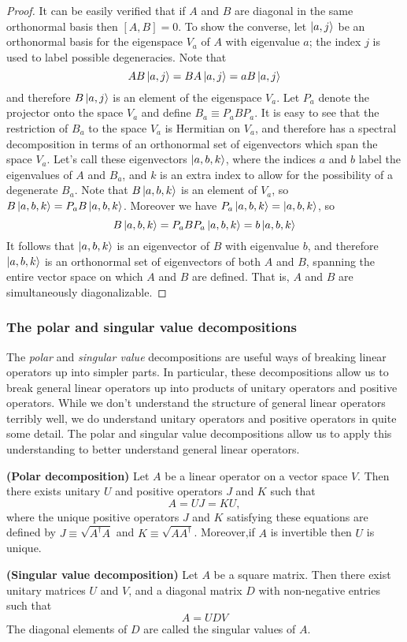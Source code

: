 \begin{proof}
    It can be easily verified that if $A$ and $B$ are diagonal in the same orthonormal basis then $[A,B] = 0$. To show the converse, let $\ket{a, j}$ be an orthonormal basis for the eigenspace $V_a$ of $A$ with eigenvalue $a$; the index $j$ is used to label possible degeneracies. Note that
        $$AB\ket{a, j} = BA\ket{a, j} = aB\ket{a, j}$$
    and therefore $B\ket{a, j}$ is an element of the eigenspace $V_a$. Let $P_a$ denote the projector onto the space $V_a$ and define $B_a \equiv P_aBP_a$. It is easy to see that the restriction of $B_a$ to the space $V_a$ is Hermitian on $V_a$, and therefore has a spectral decomposition in terms of an orthonormal set of eigenvectors which span the space $V_a$. Let’s call these eigenvectors $\ket{a, b, k}$, where the indices $a$ and $b$ label the eigenvalues of $A$ and $B_a$, and $k$ is an extra index to allow for the possibility of a degenerate $B_a$. Note that $B\ket{a, b, k}$ is an element of $V_a$, so $B\ket{a, b, k} = P_aB\ket{a, b, k}$. Moreover we have $P_a\ket{a, b, k} = \ket{a, b, k}$, so
        $$B\ket{a, b, k} = P_aBP_a\ket{a, b, k} = b\ket{a, b, k}$$
    It follows that $\ket{a, b, k}$ is an eigenvector of $B$ with eigenvalue $b$, and therefore $\ket{a, b, k}$ is an orthonormal set of eigenvectors of both $A$ and $B$, spanning the entire vector space on which $A$ and $B$ are defined. That is, $A$ and $B$ are simultaneously diagonalizable.
\end{proof}
\newpage
\subsubsection{The polar and singular value decompositions}
The \textit{polar} and \textit{singular value} decompositions are useful ways of breaking linear operators up into simpler parts. In particular, these decompositions allow us to break general linear operators up into products of unitary operators and positive operators. While we don’t understand the structure of general linear operators terribly well, we do understand unitary operators and positive operators in quite some detail. The polar and singular value decompositions allow us to apply this understanding to better understand general linear operators.
\begin{theorem}
    \textbf{(Polar decomposition)} Let $A$ be a linear operator on a vector space $V$. Then there exists unitary $U$ and positive operators $J$ and $K$ such that
    $$A = UJ = KU,$$
    where the unique positive operators $J$ and $K$ satisfying these equations are defined by $J \equiv \sqrt{A^\dag A}$ and $K \equiv \sqrt{AA^\dag}$. Moreover,if $A$ is invertible then $U$ is unique.
\end{theorem}
\begin{corollary}
    \textbf{(Singular value decomposition)} Let $A$ be a square matrix. Then there exist unitary matrices $U$ and $V$, and a diagonal matrix $D$ with non-negative entries such that
        $$A = UDV$$
    The diagonal elements of $D$ are called the singular values of $A$.
\end{corollary}

